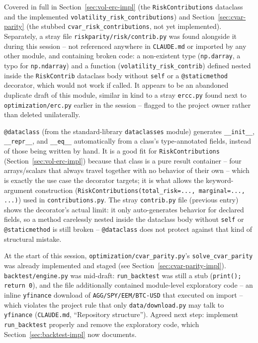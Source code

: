 \documentclass[11pt]{article}
\begin{document}
\begin{description}[style=nextline,leftmargin=0pt]
\item[Q: Explain \texttt{riskparity/risk/contributions.py} in detail.]
Covered in full in Section~\ref{sec:vol-erc-impl} (the
\texttt{RiskContributions} dataclass and the implemented
\texttt{volatility\_risk\_contributions}) and
Section~\ref{sec:cvar-parity} (the stubbed
\texttt{cvar\_risk\_contributions}, not yet implemented). Separately, a
stray file \texttt{riskparity/risk/contrib.py} was found alongside it
during this session -- not referenced anywhere in \texttt{CLAUDE.md} or
imported by any other module, and containing broken code: a
non-existent type (\texttt{np.darray}, a typo for \texttt{np.ndarray})
and a function (\texttt{volatility\_risk\_contrib}) defined nested
inside the \texttt{RiskContrib} dataclass body without \texttt{self} or
a \texttt{@staticmethod} decorator, which would not work if called. It
appears to be an abandoned duplicate draft of this module, similar in
kind to a stray \texttt{ercc.py} found next to
\texttt{optimization/erc.py} earlier in the session -- flagged to the
project owner rather than deleted unilaterally.

\item[Q: What is \texttt{@dataclass}, and is it needed for \texttt{RiskContributions}?]
\texttt{@dataclass} (from the standard-library \texttt{dataclasses}
module) generates \texttt{\_\_init\_\_}, \texttt{\_\_repr\_\_}, and
\texttt{\_\_eq\_\_} automatically from a class's type-annotated fields,
instead of those being written by hand. It is a good fit for
\texttt{RiskContributions} (Section~\ref{sec:vol-erc-impl}) because
that class is a pure result container -- four arrays/scalars that
always travel together with no behavior of their own -- which is
exactly the use case the decorator targets; it is what allows the
keyword-argument construction
(\texttt{RiskContributions(total\_risk=..., marginal=..., ...)}) used
in \texttt{contributions.py}. The stray \texttt{contrib.py} file
(previous entry) shows the decorator's actual limit: it only
auto-generates behavior for declared fields, so a method carelessly
nested inside the dataclass body without \texttt{self} or
\texttt{@staticmethod} is still broken -- \texttt{@dataclass} does not
protect against that kind of structural mistake.

\item[Q: What is the current state of the project, and what should we work on next?]
At the start of this session, \texttt{optimization/cvar\_parity.py}'s
\texttt{solve\_cvar\_parity} was already implemented and staged (see
Section~\ref{sec:cvar-parity-impl}). \texttt{backtest/engine.py} was
mid-draft: \texttt{run\_backtest} was still a stub
(\texttt{print(); return 0}), and the file additionally contained
module-level exploratory code -- an inline \texttt{yfinance} download of
\texttt{AGG/SPY/EEM/BTC-USD} that executed on import -- which violates
the project rule that only \texttt{data/download.py} may talk to
\texttt{yfinance} (\texttt{CLAUDE.md}, ``Repository structure''). Agreed
next step: implement \texttt{run\_backtest} properly and remove the
exploratory code, which Section~\ref{sec:backtest-impl} now documents.


\end{description}
\end{document}
